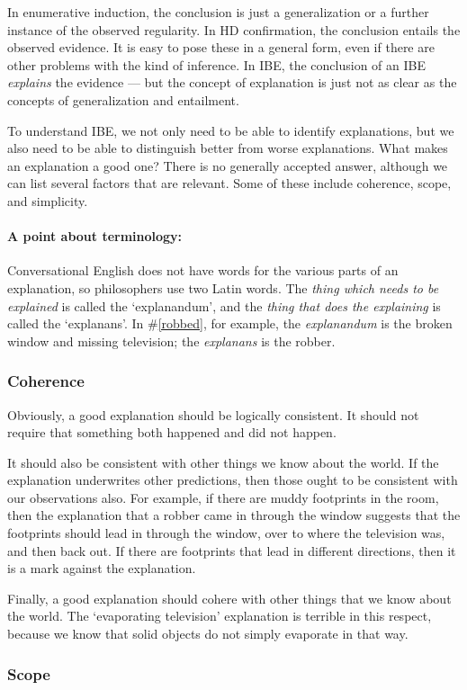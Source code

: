 \documentclass[]{article}
\newcommand*{\terminology}{\paragraph{A point about terminology:}}
\begin{document}
In enumerative induction, the conclusion is just a generalization or a further instance of the observed regularity. In HD confirmation, the conclusion entails the observed evidence. It is easy to pose these in a general form, even if there are other problems with the kind of inference. In IBE, the conclusion of an IBE \emph{explains} the evidence --- but the concept of explanation is just not as clear as the concepts of generalization and entailment.

To understand IBE, we not only need to be able to identify explanations, but we also need to be able to distinguish better from worse explanations. What makes an explanation a good one? There is no generally accepted answer, although we can list several factors that are relevant. Some of these include coherence, scope, and simplicity.

\terminology Conversational English does not have words for the various parts of an explanation, so philosophers use two Latin words. The \emph{thing which needs to be explained} is called the `explanandum', and the \emph{thing that does the explaining} is called the `explanans'. In \#\ref{robbed}, for example, the \emph{explanandum} is the broken window and missing television; the \emph{explanans} is the robber.

\subsubsection{Coherence}

Obviously, a good explanation should be logically consistent. It should not require that something both happened and did not happen.

It should also be consistent with other things we know about the world. If the explanation underwrites other predictions, then those ought to be consistent with our observations also. For example, if there are muddy footprints in the room, then the explanation that a robber came in through the window suggests that the footprints should lead in through the window, over to where the television was, and then back out. If there are footprints that lead in different directions, then it is a mark against the explanation.

Finally, a good explanation should cohere with other things that we know about the world. The `evaporating television' explanation is terrible in this respect, because we know that solid objects do not simply evaporate in that way.

\subsubsection{Scope}
\end{document}
